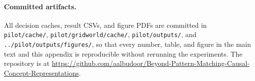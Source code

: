 \documentclass{article}
\begin{document}
\paragraph{Committed artifacts.} All decision caches, result CSVs, and figure
PDFs are committed in \texttt{pilot/cache/}, \texttt{pilot/gridworld/cache/},
\texttt{pilot/outputs/}, and \texttt{../pilot/outputs/figures/}, so that every
number, table, and figure in the main text and this appendix is reproducible
without rerunning the experiments. The repository is at
\url{https://github.com/aalbudoor/Beyond-Pattern-Matching-Causal-Concept-Representations}.
\end{document}
